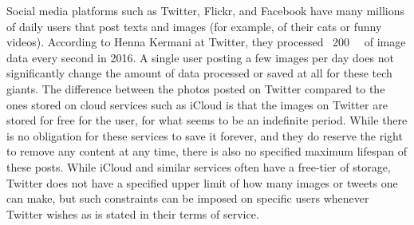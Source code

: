 Social media platforms such as Twitter, Flickr, and Facebook have many millions of daily users that post texts and images (for example, of their cats or funny videos). According to Henna Kermani at Twitter, they processed ~\SI{200}{\giga\byte} of image data every second in 2016\cite{MobileScaleLondona}. A single user posting a few images per day does not significantly change the amount of data processed or saved at all for these tech giants. %
The difference between the photos posted on Twitter compared to the ones stored on cloud services such as iCloud is that the images on Twitter are stored for free for the user, for what seems to be an indefinite period. While there is no obligation for these services to save it forever, and they do reserve the right to remove any content at any time, %
there is also no specified maximum lifespan of these posts. While iCloud and similar services often have a free-tier of storage, Twitter does not have a specified upper limit of how many images or tweets one can make, but such constraints can be imposed on specific users whenever Twitter wishes as is stated in their terms of service.













